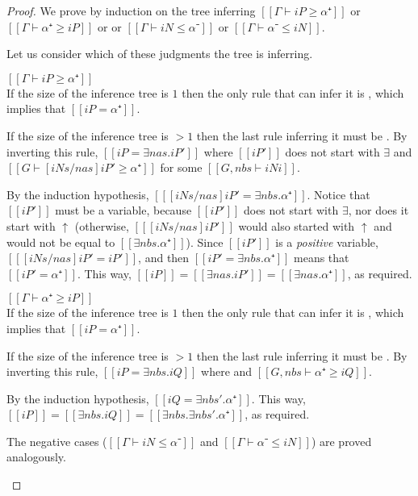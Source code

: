 \begin{proof}
  We prove by induction on the tree
  inferring $[[Γ ⊢ iP ≥ α⁺]]$ or $[[Γ ⊢ α⁺ ≥ iP ]]$ or
  or $[[Γ ⊢ iN ≤ α⁻]]$ or $[[Γ ⊢ α⁻ ≤ iN ]]$.

  Let us consider which of these judgments the tree is inferring.
  \begin{caseof}
  \item $[[Γ ⊢ iP ≥ α⁺]]$\\
    If the size of the inference tree is $1$ then the only rule that can infer
    it is , which
    implies that $[[iP = α⁺]]$.

    If the size of the inference tree is $>1$ then the last rule inferring
    it must be . By inverting this rule,
    $[[iP = ∃nas.iP']]$ where $[[iP']]$ does not start with $\exists$ and
    $[[G ⊢ [iNs/nas] iP' ≥ α⁺]]$ for some $[[G, nbs ⊢ iNi]]$.

    By the induction hypothesis, $[[ [iNs/nas] iP' = ∃nbs.α⁺]]$.
    Notice that $[[iP']]$ must be a variable, because
    $[[iP']]$ does not start with $\exists$, nor does it start with
    $\uparrow$ (otherwise, $[[ [iNs/nas] iP' ]]$ would also
    started with $\uparrow$ and would not be equal to $[[∃nbs.α⁺]]$).
    Since $[[iP']]$ is a \emph{positive} variable, $[[ [iNs/nas] iP' = iP']]$,
    and then $[[iP' = ∃nbs.α⁺]]$ means that $[[iP' = α⁺]]$.
    This way, $[[iP]] = [[∃nas.iP']] = [[∃nas.α⁺]]$, as required.

  \item $[[Γ ⊢ α⁺ ≥ iP]]$\\
    If the size of the inference tree is $1$ then the only rule that can infer
    it is , which
    implies that $[[iP = α⁺]]$.

    If the size of the inference tree is $>1$ then the last rule inferring
    it must be . By inverting this rule,
    $[[iP = ∃nbs.iQ]]$ where and $[[G, nbs ⊢ α⁺ ≥ iQ]]$.

    By the induction hypothesis, $[[iQ = ∃nbs'.α⁺]]$.
    This way, $[[iP]] = [[∃nbs.iQ]] = [[∃nbs.∃nbs'.α⁺]]$, as required.

  \item The negative cases ($[[Γ ⊢ iN ≤ α⁻]]$ and $[[Γ ⊢ α⁻ ≤ iN ]]$)
    are proved analogously.
  \end{caseof}
\end{proof}

